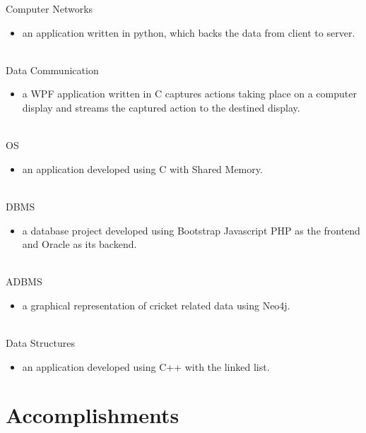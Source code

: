 \documentclass[letterpaper]{Baseclass}
\begin{document}
\begin{envvar} 
	\envvaritem
	{Computer}
	{Networks}
	{\hspace{0.3cm}{Data Stacker}}
	{}
	{}
	{\begin{itemize}
			\item an application written in python, which backs the data from client to server.      
	\end{itemize}}
	\\
	\envvaritem
	{Data}
	{Communication}
	{\hspace{0.3cm}{Real Time}}
	{}
	{}
	{
	{\begin{itemize}
			\item a WPF application written in C captures actions taking place on a computer display and streams the captured action to the destined display.
	\end{itemize} }
	}
	\\
	\envvaritem
	{OS}
	{}
	{\hspace{0.3cm}{Process Docketing}}
	{}
	{}
	{
		{\begin{itemize}
				\item  an application developed using C with Shared Memory.
		\end{itemize}}
	}
	\\
	\envvaritem
	{DBMS}
	{}
	{\hspace{0.3cm}{SwiftX}}
	{}
	{}
	{
		{\begin{itemize}
				\item a database project developed using Bootstrap Javascript PHP as the frontend and Oracle as its backend.
		\end{itemize}}
	}
    \\
	\envvaritem
	{ADBMS}
	{}
	{\hspace{0.3cm}{CricPlot}}
	{}
	{}
	{
		{\begin{itemize}
				\item a graphical representation of cricket related data using Neo4j.
		\end{itemize}}
	}
    \\
	\envvaritem
	{Data}
	{Structures}
	{\hspace{0.3cm}{RemindME}}
	{}
	{}
	{
		{\begin{itemize}
				\item an application developed using C++ with the linked list.
		\end{itemize}}
	}
	
\end{envvar}

\section{Accomplishments}
\end{document}
